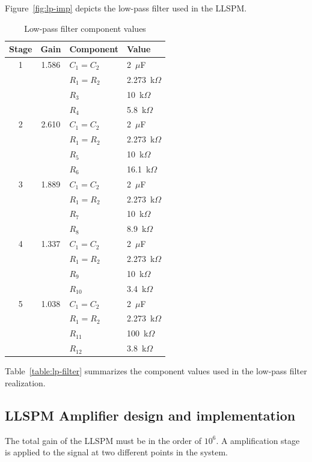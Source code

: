 Figure~\vref{fig:lp-imp} depicts the low-pass filter used in the
LLSPM. 

\begin{table}
\begin{center}	
	\begin{tabular}[htpb]{|c|c|l|l|} \hline
	Stage & Gain & Component & Value \\ \hline
	1& 1.586 & $C_1 = C_2$ & 2~$\mu$F \\
	 & 		 & $R_1 = R_2$ & 2.273~k$\Omega$ \\ 
	 &		 & $R_3$ & 10~k$\Omega$ \\
	 &       & $R_4$ & 5.8~k$\Omega$ \\
	2& 2.610 & $C_1 = C_2$ & 2~$\mu$F \\
	 & 		 & $R_1 = R_2$ & 2.273~k$\Omega$ \\ 
	 & 		 & $R_5$ & 10~k$\Omega$ \\
	 & 		 & $R_6$ & 16.1~k$\Omega$ \\
	3& 1.889 & $C_1 = C_2$ & 2~$\mu$F \\
	 & 		 & $R_1 = R_2$ & 2.273~k$\Omega$ \\ 
	 & 		 & $R_7$ & 10~k$\Omega$ \\
	 & 		 & $R_8$ & 8.9~k$\Omega$ \\
	4& 1.337 & $C_1 = C_2$ & 2~$\mu$F \\
	 &    	 & $R_1 = R_2$ & 2.273~k$\Omega$ \\ 
	 & 		 & $R_{9}$ & 10~k$\Omega$ \\
	 &  	 & $R_{10}$ & 3.4~k$\Omega$ \\
	5& 1.038 & $C_1 = C_2$ & 2~$\mu$F \\
	 &  	 & $R_1 = R_2$ & 2.273~k$\Omega$ \\ 
	 & 		 & $R_{11}$ & 100~k$\Omega$ \\
	 &   	 & $R_{12}$ & 3.8~k$\Omega$ \\
	\hline
	\end{tabular}
	\caption{Low-pass filter component values}
	\label{table:lp-filter}
\end{center}	
\end{table}

Table~\vref{table:lp-filter} summarizes the component values used in
the low-pass filter realization.


\subsection{LLSPM Amplifier design and implementation}
\label{secion:llspm-amp}
The total gain of the LLSPM must be in the order of $10^6$. A
amplification stage is applied to the signal at two different points
in the system. 

